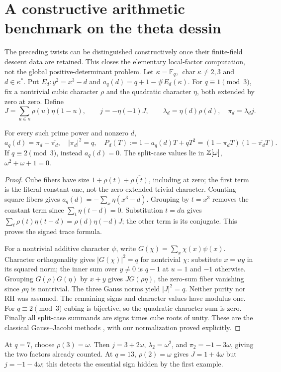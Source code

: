 \section{A constructive arithmetic benchmark on the theta dessin}
The preceding twists can be distinguished constructively once their finite-field descent data are retained. This closes the elementary local-factor computation, not the global positive-determinant problem. Let $\kappa=\mathbb F_q$, $\operatorname{char}\kappa\ne2,3$ and $d\in\kappa^*$. Put $E_d:y^2=x^3-d$ and $a_q(d)=q+1-\#E_d(\kappa)$. For $q\equiv1\pmod3$, fix a nontrivial cubic character $\rho$ and the quadratic character $\eta$, both extended by zero at zero. Define
\[
 J=\sum_{u\in\kappa}\rho(u)\eta(1-u),\qquad
 j=-\eta(-1)J,\qquad \lambda_d=\eta(d)\rho(d),\quad \pi_d=\lambda_dj.
\]
\begin{theorem}\label{thm:jacobitheta}
For every such prime power and nonzero $d$,
\[
 a_q(d)=\pi_d+\overline{\pi_d},\quad |\pi_d|^2=q,\quad
 P_d(T):=1-a_q(d)T+qT^2=(1-\pi_dT)(1-\overline{\pi_d}T).
\]
If $q\equiv2\pmod3$, instead $a_q(d)=0$. The split-case values lie in $\mathbb Z[\omega]$, $\omega^2+\omega+1=0$.
\end{theorem}
\begin{proof}
Cube fibers have size $1+\rho(t)+\overline{\rho(t)}$, including at zero; the first term is the literal constant one, not the zero-extended trivial character. Counting square fibers gives $a_q(d)=-\sum_x\eta(x^3-d)$. Grouping by $t=x^3$ removes the constant term since $\sum_t\eta(t-d)=0$. Substitution $t=du$ gives $\sum_t\rho(t)\eta(t-d)=\rho(d)\eta(-d)J$; the other term is its conjugate. This proves the signed trace formula.

For a nontrivial additive character $\psi$, write $G(\chi)=\sum_x\chi(x)\psi(x)$. Character orthogonality gives $|G(\chi)|^2=q$ for nontrivial $\chi$: substitute $x=uy$ in its squared norm; the inner sum over $y\ne0$ is $q-1$ at $u=1$ and $-1$ otherwise. Grouping $G(\rho)G(\eta)$ by $x+y$ gives $JG(\rho\eta)$, the zero-sum fiber vanishing since $\rho\eta$ is nontrivial. The three Gauss norms yield $|J|^2=q$. Neither purity nor RH was assumed. The remaining signs and character values have modulus one. For $q\equiv2\pmod3$ cubing is bijective, so the quadratic-character sum is zero. Finally all split-case summands are signs times cube roots of unity. These are the classical Gauss--Jacobi methods \cite[pp.499--502]{WeilJacobi}, with our normalization proved explicitly.
\end{proof}
At $q=7$, choose $\rho(3)=\omega$. Then $j=3+2\omega$, $\lambda_2=\omega^2$, and $\pi_2=-1-3\omega$, giving the two factors already counted. At $q=13$, $\rho(2)=\omega$ gives $J=1+4\omega$ but $j=-1-4\omega$; this detects the essential sign hidden by the first example.

